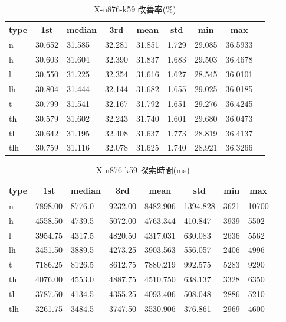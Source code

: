 \begin{table}[htbp]
    \caption{X-n876-k59 改善率(\%)}
    \begin{tabular}{|l|l|l|l|l|l|l|l|l|}\hline
    \multicolumn{1}{|c|}{\textbf{type}}
    &\multicolumn{1}{|c|}{\textbf{1st}}
    &\multicolumn{1}{c|}{\textbf{median}}
    &\multicolumn{1}{c|}{\textbf{3rd}}
    &\multicolumn{1}{c|}{\textbf{mean}}
    &\multicolumn{1}{c|}{\textbf{std}}
    &\multicolumn{1}{c|}{\textbf{min}}
    &\multicolumn{1}{c|}{\textbf{max}}\\\hline
	n & 30.652 & 31.585 & 32.281 & 31.851 & 1.729 & 29.085 & 36.5933\\\hline
	h & 30.603 & 31.604 & 32.390 & 31.837 & 1.683 & 29.503 & 36.4678\\\hline
	l & 30.550 & 31.225 & 32.354 & 31.616 & 1.627 & 28.545 & 36.0101\\\hline
	lh & 30.804 & 31.444 & 32.144 & 31.682 & 1.655 & 29.025 & 36.0185\\\hline
	t & 30.799 & 31.541 & 32.167 & 31.792 & 1.651 & 29.276 & 36.4245\\\hline
	th & 30.579 & 31.602 & 32.243 & 31.740 & 1.601 & 29.680 & 36.0473\\\hline
	tl & 30.642 & 31.195 & 32.408 & 31.637 & 1.773 & 28.819 & 36.4137\\\hline
	tlh & 30.759 & 31.116 & 32.078 & 31.625 & 1.740 & 28.921 & 36.3266\\\hline
	\end{tabular}
\end{table}
\begin{table}[htbp]
    \caption{X-n876-k59 探索時間(ms)}
    \begin{tabular}{|l|l|l|l|l|l|l|l|l|}\hline
    \multicolumn{1}{|c|}{\textbf{type}}
    &\multicolumn{1}{|c|}{\textbf{1st}}
    &\multicolumn{1}{c|}{\textbf{median}}
    &\multicolumn{1}{c|}{\textbf{3rd}}
    &\multicolumn{1}{c|}{\textbf{mean}}
    &\multicolumn{1}{c|}{\textbf{std}}
    &\multicolumn{1}{c|}{\textbf{min}}
    &\multicolumn{1}{c|}{\textbf{max}}\\\hline
	n & 7898.00 & 8776.0 & 9232.00 & 8482.906 & 1394.828 & 3621 & 10700\\\hline
	h & 4558.50 & 4739.5 & 5072.00 & 4763.344 & 410.847 & 3939 & 5502\\\hline
	l & 3954.75 & 4317.5 & 4820.50 & 4317.031 & 630.083 & 2636 & 5562\\\hline
	lh & 3451.50 & 3889.5 & 4273.25 & 3903.563 & 556.057 & 2406 & 4996\\\hline
	t & 7186.25 & 8126.5 & 8612.75 & 7880.219 & 992.575 & 5283 & 9290\\\hline
	th & 4076.00 & 4553.0 & 4887.75 & 4510.750 & 638.137 & 3328 & 6350\\\hline
	tl & 3787.50 & 4134.5 & 4355.25 & 4093.406 & 508.048 & 2886 & 5210\\\hline
	tlh & 3261.75 & 3484.5 & 3747.50 & 3530.906 & 376.861 & 2969 & 4600\\\hline
	\end{tabular}
\end{table}
